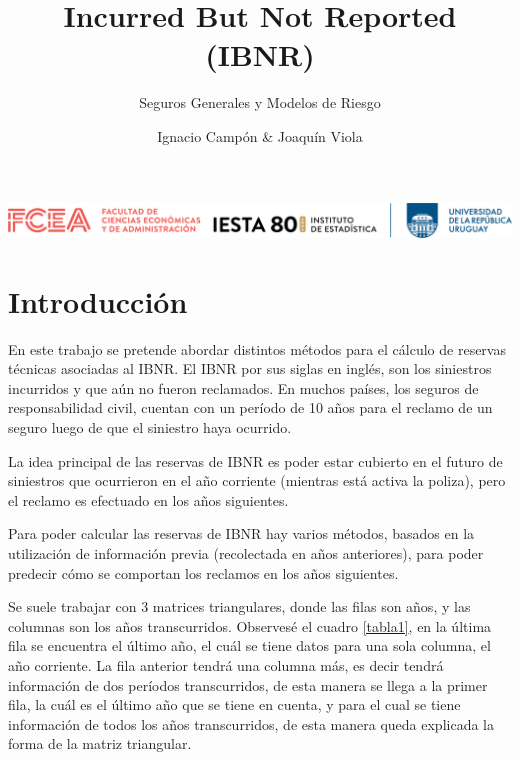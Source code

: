 \documentclass[
  12pt,
]{article}
\title{Incurred But Not Reported (IBNR)}
\subtitle{Seguros Generales y Modelos de Riesgo}
\author{Ignacio Campón \& Joaquín Viola}
\date{}
\begin{document}
\maketitle

\maketitle

\thispagestyle{empty} %
\vspace*{\fill} %
\begin{center}
\includegraphics[width=16cm]{imagenes/logo_inst_80.png}\\[1cm] %
\end{center}

\newpage

\tableofcontents

\newpage

\hypertarget{introducciuxf3n}{%
\section{Introducción}\label{introducciuxf3n}}

En este trabajo se pretende abordar distintos métodos para el cálculo de
reservas técnicas asociadas al IBNR. El IBNR por sus siglas en inglés,
son los siniestros incurridos y que aún no fueron reclamados. En muchos
países, los seguros de responsabilidad civil, cuentan con un período de
10 años para el reclamo de un seguro luego de que el siniestro haya
ocurrido.

La idea principal de las reservas de IBNR es poder estar cubierto en el
futuro de siniestros que ocurrieron en el año corriente (mientras está
activa la poliza), pero el reclamo es efectuado en los años siguientes.

Para poder calcular las reservas de IBNR hay varios métodos, basados en
la utilización de información previa (recolectada en años anteriores),
para poder predecir cómo se comportan los reclamos en los años
siguientes.

Se suele trabajar con 3 matrices triangulares, donde las filas son años,
y las columnas son los años transcurridos. Observesé el cuadro
\ref{tabla1}, en la última fila se encuentra el último año, el cuál se
tiene datos para una sola columna, el año corriente. La fila anterior
tendrá una columna más, es decir tendrá información de dos períodos
transcurridos, de esta manera se llega a la primer fila, la cuál es el
último año que se tiene en cuenta, y para el cual se tiene información
de todos los años transcurridos, de esta manera queda explicada la forma
de la matriz triangular.
\end{document}

